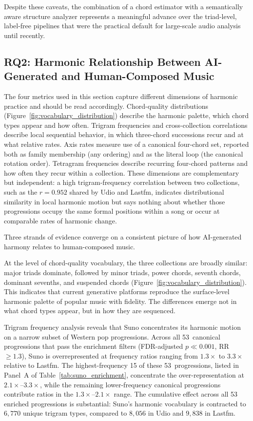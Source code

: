 \documentclass{article}
\newcommand{\rev}[1]{{\color{r2}#1}} %
\begin{document}
Despite these caveats, the combination of a chord estimator with a semantically aware structure analyzer represents a meaningful advance over the triad-level, label-free pipelines that were the practical default for large-scale audio analysis until recently.

\subsection{RQ2: Harmonic Relationship Between AI-Generated and Human-Composed Music}
\label{sec:disc_harmony}

The four metrics used in this section capture different dimensions of harmonic practice and should be read accordingly. Chord-quality distributions (Figure~\ref{fig:vocabulary_distribution}) describe the harmonic palette, which chord types appear and how often. Trigram frequencies and cross-collection correlations describe local sequential behavior, in which three-chord successions recur and at what relative rates. \rev{Axis rates measure use of a canonical four-chord set, reported both as family membership (any ordering) and as the literal loop (the canonical rotation order).} Tetragram frequencies describe recurring four-chord patterns and how often they recur within a collection. These dimensions are complementary but independent: a high trigram-frequency correlation between two collections, such as the $r = 0.952$ shared by Udio and Lastfm, indicates distributional similarity in local harmonic motion but says nothing about whether those progressions occupy the same formal positions within a song or occur at comparable rates of harmonic change.

Three strands of evidence converge on a consistent picture of how AI-generated harmony relates to human-composed music.

At the level of chord-quality vocabulary, the three collections are broadly similar: major triads dominate, followed by minor triads, power chords, seventh chords, dominant sevenths, and suspended chords (Figure~\ref{fig:vocabulary_distribution}). This indicates that current generative platforms reproduce the surface-level harmonic palette of popular music with fidelity. The differences emerge not in what chord types appear, but in how they are sequenced.

Trigram frequency analysis reveals that Suno concentrates its harmonic motion on a narrow subset of Western pop progressions. Across all 53~canonical progressions that pass the enrichment filters (FDR-adjusted $p \ll 0.001$, RR~$\geq 1.3$), Suno is overrepresented at frequency ratios ranging from $1.3\times$ to $3.3\times$ relative to Lastfm. The highest-frequency 15 of these 53~progressions, listed in Panel~A of Table~\ref{tab:suno_enrichment}, concentrate the over-representation at $2.1\times$--$3.3\times$, while the remaining lower-frequency canonical progressions contribute ratios in the $1.3\times$--$2.1\times$ range. The cumulative effect across all 53 enriched progressions is substantial: Suno's harmonic vocabulary is contracted to $6,770$ unique trigram types, compared to $8,056$ in Udio and $9,838$ in Lastfm.
\end{document}
